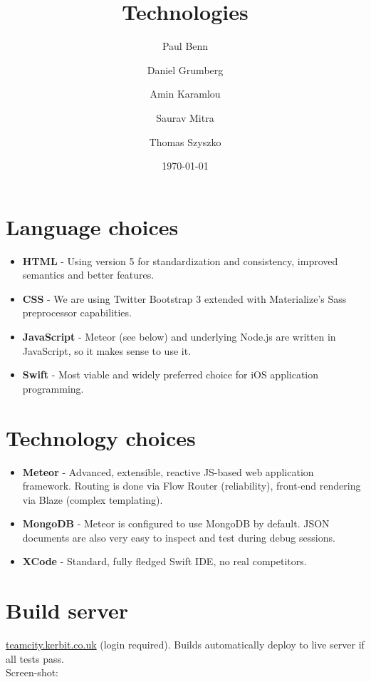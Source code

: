 \documentclass[a4wide, 11pt]{article}
\begin{document}
\title{Technologies}

\author{Paul Benn \and Daniel Grumberg \and Amin Karamlou \and Saurav Mitra \and Thomas Szyszko }

\date{\today}

\maketitle

\clearpage

\section{Language choices}

\begin{itemize}
	\item \textbf{HTML} - Using version 5 for standardization and consistency, improved semantics and better features.
	\item \textbf{CSS} - We are using Twitter Bootstrap 3 extended with Materialize's Sass preprocessor capabilities.
	\item \textbf{JavaScript} - Meteor (see below) and underlying Node.js are written in JavaScript, so it makes sense to use it.
	\item \textbf{Swift} - Most viable and widely preferred choice for iOS application programming.
\end{itemize}

\section{Technology choices}

\begin{itemize}
	\item \textbf{Meteor} - Advanced, extensible, reactive JS-based web application framework. Routing is done via Flow Router (reliability), front-end rendering via Blaze (complex templating).
	\item \textbf{MongoDB} - Meteor is configured to use MongoDB by default. JSON documents are also very easy to inspect and test during debug sessions.
	\item \textbf{XCode} - Standard, fully fledged Swift IDE, no real competitors.
\end{itemize}

\section{Build server}

\url{teamcity.kerbit.co.uk} (login required). Builds automatically deploy to live server if all tests pass.\\
Screen-shot:
\end{document}
